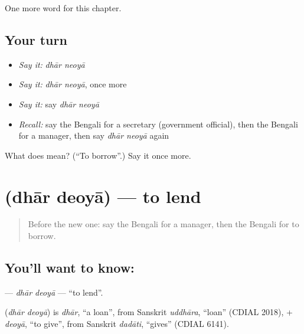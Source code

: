 \begin{grammarlens}[title={What you've built}]
One more word for this chapter.
\end{grammarlens}

\subsection*{Your turn}
\begin{itemize}
\raggedright
  \item \emph{Say it:} \emph{dhār neoyā}
  \item \emph{Say it:} \emph{dhār neoyā}, once more
  \item \emph{Say it:} say \emph{dhār neoyā}
  \item \emph{Recall:} say the Bengali for a secretary (government official), then the Bengali for a manager, then say \emph{dhār neoyā} again
\end{itemize}

\begin{tcolorbox}[breakable,colback=teal!4,colframe=teal!35!black,title={Before you move on}]
What does   mean? (\textquotedblleft{}To borrow\textquotedblright{}.) Say it once more.
\end{tcolorbox}
\section[\texorpdfstring{\bn{ধার} \bn{দেওয়া} (dhār deoyā)}{ধার দেওয়া (dhār deoyā)}]{  (dhār deoyā) — to lend}

\label{lesson:BN-C209-dhar-deoya}



\begin{quote}
Before the new one: say the Bengali for a manager, then the Bengali for to borrow.
\end{quote}

\subsection*{You'll want to know:  }
\textbf{ } — \emph{dhār deoyā} — \textquotedblleft{}to lend\textquotedblright{}.

\begin{cousinweb}
\textbf{ } (\emph{dhār deoyā}) is \emph{dhār}, \textquotedblleft{}a loan\textquotedblright{}, from Sanskrit \emph{uddhāra}, \textquotedblleft{}loan\textquotedblright{} (CDIAL 2018), + \emph{deoyā}, \textquotedblleft{}to give\textquotedblright{}, from Sanskrit \emph{dadāti}, \textquotedblleft{}gives\textquotedblright{} (CDIAL 6141).
\end{cousinweb}


